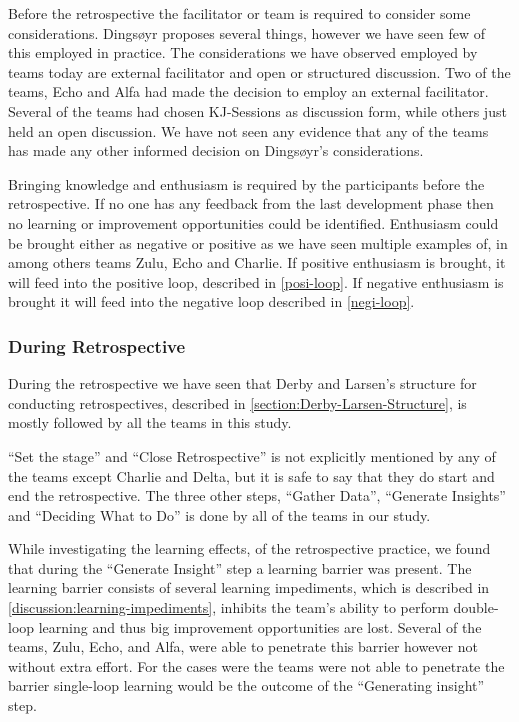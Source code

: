 Before the retrospective the facilitator or team is required to consider some considerations. Dingsøyr \cite{Dingsoyr2004} proposes several things, however we have seen few of this employed in practice. The considerations we have observed employed by teams today are external facilitator and open or structured discussion. Two of the teams, Echo and Alfa had made the decision to employ an external facilitator. Several of the teams had chosen KJ-Sessions as discussion form, while others just held an open discussion. We have not seen any evidence that any of the teams has made any other informed decision on Dingsøyr's considerations. 

Bringing knowledge and enthusiasm is required by the participants before the retrospective. If no one has any feedback from the last development phase then no learning or improvement opportunities could be identified. Enthusiasm could be brought either as negative or positive as we have seen multiple examples of, in among others teams Zulu, Echo and Charlie. If positive enthusiasm is brought, it will feed into the positive loop, described in \autoref{posi-loop}. If negative enthusiasm is brought it will feed into the negative loop described in \autoref{negi-loop}. 

\subsubsection{During Retrospective}
During the retrospective we have seen that Derby and Larsen's \cite{Larsen2006} structure for conducting retrospectives, described in \autoref{section:Derby-Larsen-Structure}, is mostly followed by all the teams in this study. 

``Set the stage'' and ``Close Retrospective'' is not explicitly mentioned by any of the teams except Charlie and Delta, but it is safe to say that they do start and end the retrospective. The three other steps, ``Gather Data'', ``Generate Insights'' and ``Deciding What to Do'' is done by all of the teams in our study. 

While investigating the learning effects, of the retrospective practice, we found that during the ``Generate Insight'' step a learning barrier was present. The learning barrier consists of several learning impediments, which is described in \autoref{discussion:learning-impediments}, inhibits the team's ability to perform double-loop learning and thus big improvement opportunities are lost. Several of the teams, Zulu, Echo, and Alfa, were able to penetrate this barrier however not without extra effort. For the cases were the teams were not able to penetrate the barrier single-loop learning would be the outcome of the ``Generating insight'' step.

